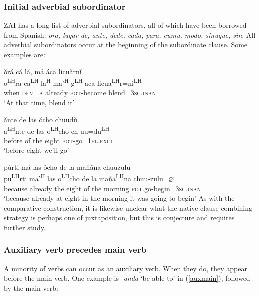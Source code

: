 \subsubsection{Initial adverbial subordinator}

ZAI has a long list of adverbial subordinators, all of which have been borrowed from Spanish: \textit{ora, lugar de, ante, dede, cada, para, cumu, modo, sinuque, sin}. All adverbial subordinators occur at the beginning of the subordinate clause. Some examples are:

\ea\label{ora}
\glll \v{o}r\'{a} c\'{a} l\'{a}, m\'{a} \'{a}ca licu\v{a}rn\v{i}  \\
o\textsuperscript{LH}ra ca\textsuperscript{LH} la\textsuperscript{H} ma'\textsuperscript{H} g\textsuperscript{LH}-aca licua\textsuperscript{LH}r=ni\textsuperscript{LH} \\
when \textsc{dem} \textsc{la} already \textsc{pot}-become blend=\textsc{3sg.inan} \\
\glt `At that time, blend it'
\z

\ea\label{ante}
\glll \v{a}nte de las \v{o}cho chuud\v{u}  \\
a\textsuperscript{LH}nte de las o\textsuperscript{LH}cho ch-uu=du\textsuperscript{LH} \\
before of the eight \textsc{pot}-go=\textsc{1pl.excl} \\
\glt `before eight we'll go'
\z

\ea\label{purti}
\glll p\v{u}rti m\'{a} las \v{o}cho de la mañ\v{a}na chuuzulu \\
pu\textsuperscript{LH}rti ma'\textsuperscript{H} las o\textsuperscript{LH}cho de la maña\textsuperscript{LH}na chuu-zulu=$\varnothing$ \\
because already the eight of the morning \textsc{pot}.go-begin=\textsc{3sg.inan} \\
\glt `because already at eight in the morning it was going to begin'
\z
As with the comparative construction, it is likewise unclear what the native clause-combining strategy is perhaps one of juxtaposition, but this is conjecture and requires further study.





\subsubsection{Auxiliary verb precedes main verb}
	
A minority of verbs can occur as an auxiliary verb. When they do, they appear before the main verb. One example is \textit{-anda} `be able to' in (\ref{auxmain}), followed by the main verb:

